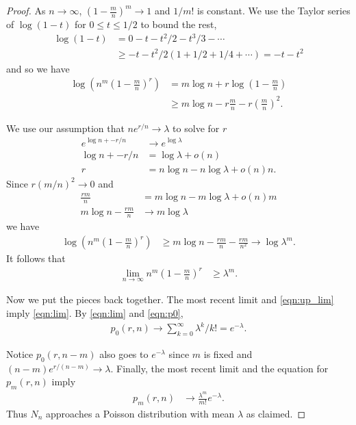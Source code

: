 \documentclass[12pt]{article}
\theoremstyle{definition}
\begin{document}
\begin{proof}
As $n \rightarrow \infty$, $\left(1-\frac{m}{n}\right)^m \rightarrow 1$
and $1/m!$ is constant.
We use the Taylor series of $\log(1-t)$ for $0 \leq t \leq 1/2$
to bound the rest,
\begin{align}
\log(1-t) &= 0 - t - t^2/2 -t^3/3 - \cdots \nonumber\\
&\geq -t -t^2/2(1 + 1/2 + 1/4 + \cdots) = -t - t^2 \nonumber
\end{align}
and so we have
\begin{align}
\log \left(n^m\left(1-\frac{m}{n}\right)^r \right)
&= m \log n + r \log\left(1-\frac{m}{n}\right) \nonumber \\
& \geq m \log n - r\frac{m}{n} - r\left(\frac{m}{n}\right)^2. \nonumber
\end{align}

We use our assumption that $ne^{r/n} \rightarrow \lambda$
to solve for $r$
\begin{align}
e^{\log n + -r/n} &\rightarrow e^{\log \lambda} \nonumber\\
\log n + -r/n &= \log \lambda + o(n) \nonumber \\
r &= n \log n - n \log \lambda +  o(n)n. \nonumber
\end{align}
Since $r (m/n)^2 \rightarrow 0$ and
\begin{align}
\frac{rm}{n} &=m \log n - m \log \lambda +  o(n)m \nonumber \\
 m \log n - \frac{rm}{n}&\rightarrow m \log \lambda \nonumber
\end{align}
we have
\begin{align}
\log \left(n^m\left(1-\frac{m}{n}\right)^r \right)
&\geq m \log n - \frac{rm}{n} - \frac{rm}{n^2} \rightarrow \log \lambda^m. \nonumber
\end{align}
It follows that
\begin{align}
\lim_{n\rightarrow \infty} n^m\left(1-\frac{m}{n}\right)^r
&\geq \lambda^m. \nonumber
\end{align}

Now we put the pieces back together.
The most recent limit and \cref{eqn:up_lim} imply \cref{eqn:lim}.
By \cref{eqn:lim} and \cref{eqn:p0},
\begin{align}
p_0(r,n) \rightarrow \sum_{k=0}^\infty \lambda^k /k! = e^{-\lambda}. \nonumber
\end{align}

Notice $p_0(r,n-m)$ also goes to $e^{-\lambda}$
since $m$ is fixed and $(n-m)e^{r/(n-m)} \rightarrow \lambda$.
Finally, the most recent limit and the equation for $p_m(r,n)$ imply
\begin{align}
p_m(r,n) 
&\rightarrow \frac{\lambda^m}{ m!} e^{-\lambda} \nonumber.
\end{align}
Thus $N_n$ approaches a Poisson distribution with mean $\lambda$ as claimed.

\end{proof}
\end{document}
